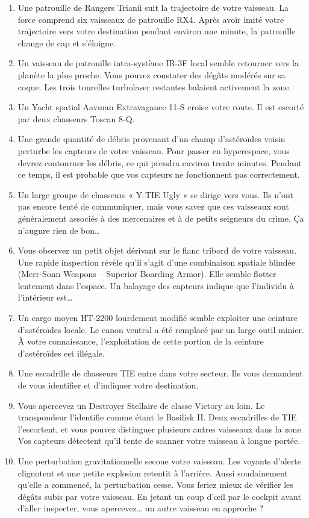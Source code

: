 \documentclass{article}
\begin{document}
\begin{enumerate}
	\item Une patrouille de Rangers Trianii suit la trajectoire de votre vaisseau. La force comprend six vaisseaux de patrouille RX4. Après avoir imité votre trajectoire vers votre destination pendant environ une minute, la patrouille change de cap et s’éloigne.
	\item Un vaisseau de patrouille intra-système IR-3F local semble retourner vers la planète la plus proche. Vous pouvez constater des dégâts modérés sur sa coque. Les trois tourelles turbolaser restantes balaient activement la zone.
	\item Un Yacht spatial Aavman Extravagance 11-S croise votre route. Il est escorté par deux chasseurs Toscan 8-Q.
	\item Une grande quantité de débris provenant d’un champ d’astéroïdes voisin perturbe les capteurs de votre vaisseau. Pour passer en hyperespace, vous devrez contourner les débris, ce qui prendra environ trente minutes. Pendant ce temps, il est probable que vos capteurs ne fonctionnent pas correctement.
	\item Un large groupe de chasseurs « Y-TIE Ugly » se dirige vers vous. Ils n’ont pas encore tenté de communiquer, mais vous savez que ces vaisseaux sont généralement associés à des mercenaires et à de petits seigneurs du crime. Ça n’augure rien de bon…
	\item Vous observez un petit objet dérivant sur le flanc tribord de votre vaisseau. Une rapide inspection révèle qu’il s’agit d’une combinaison spatiale blindée (Merr-Sonn Weapons – Superior Boarding Armor). Elle semble flotter lentement dans l’espace. Un balayage des capteurs indique que l’individu à l’intérieur est…
	\item Un cargo moyen HT-2200 lourdement modifié semble exploiter une ceinture d’astéroïdes locale. Le canon ventral a été remplacé par un large outil minier. À votre connaissance, l’exploitation de cette portion de la ceinture d’astéroïdes est illégale.
	\item Une escadrille de chasseurs TIE entre dans votre secteur. Ils vous demandent de vous identifier et d’indiquer votre destination.
	\item Vous apercevez un Destroyer Stellaire de classe Victory au loin. Le transpondeur l’identifie comme étant le Basilisk II. Deux escadrilles de TIE l’escortent, et vous pouvez distinguer plusieurs autres vaisseaux dans la zone. Vos capteurs détectent qu’il tente de scanner votre vaisseau à longue portée.
	\item Une perturbation gravitationnelle secoue votre vaisseau. Les voyants d’alerte clignotent et une petite explosion retentit à l’arrière. Aussi soudainement qu’elle a commencé, la perturbation cesse. Vous feriez mieux de vérifier les dégâts subis par votre vaisseau. En jetant un coup d’œil par le cockpit avant d’aller inspecter, vous apercevez… un autre vaisseau en approche ?

\end{enumerate}
\end{document}
